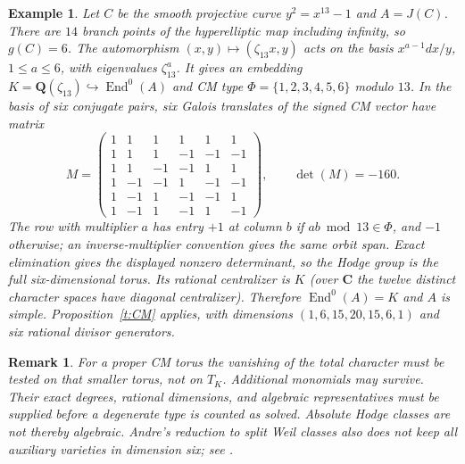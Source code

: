 \documentclass[11pt,reqno]{article}
\theoremstyle{emphasizedplain}
\theoremstyle{emphasizeddefinition}
\newtheorem{example}[theorem]{Example}
\theoremstyle{emphasizeddefinition}
\newtheorem{remark}[theorem]{Remark}
\DeclareMathOperator{\End}{End}
\newcommand{\Q}{\mathbf Q}
\newcommand{\C}{\mathbf C}
\begin{document}
\begin{example}\label{ex:CM13}
Let $C$ be the smooth projective curve $y^2=x^{13}-1$ and $A=J(C)$.
There are $14$ branch points of the hyperelliptic map including infinity,
so $g(C)=6$. The automorphism $(x,y)\mapsto(\zeta_{13}x,y)$ acts on the
basis $x^{a-1}dx/y$, $1\leq a\leq6$, with eigenvalues $\zeta_{13}^a$.
It gives an embedding $K=\Q(\zeta_{13})\hookrightarrow\End^0(A)$ and
CM type $\Phi=\{1,2,3,4,5,6\}$ modulo $13$.
In the basis of six conjugate pairs, six Galois translates of the signed
CM vector have matrix
\[
 M=\begin{pmatrix}
1&1&1&1&1&1\\
1&1&1&-1&-1&-1\\
1&1&-1&-1&1&1\\
1&-1&-1&1&-1&-1\\
1&-1&1&-1&-1&1\\
1&-1&1&-1&1&-1
\end{pmatrix},\qquad\det(M)=-160.
\]
The row with multiplier $a$ has entry $+1$ at column $b$ if
$ab\bmod13\in\Phi$, and $-1$ otherwise; an inverse-multiplier convention
gives the same orbit span. Exact elimination gives the displayed nonzero
determinant, so the Hodge group is the full six-dimensional torus.
Its rational centralizer is $K$ (over $\C$ the twelve distinct character
spaces have diagonal centralizer). Therefore $\End^0(A)=K$ and $A$ is
simple. Proposition~\ref{t:CM} applies, with dimensions
$(1,6,15,20,15,6,1)$ and six rational divisor generators.
\end{example}
\begin{remark}
For a proper CM torus the vanishing of the total character must be tested
on that smaller torus, not on $T_K$. Additional monomials may survive.
Their exact degrees, rational dimensions, and algebraic representatives
must be supplied before a degenerate type is counted as solved.
Absolute Hodge classes are not thereby algebraic. Andre's reduction to
split Weil classes also does not keep all auxiliary varieties in dimension
six; see \cite[Theorem 1.4]{MarkmanSurvey}.
\end{remark}
\end{document}
